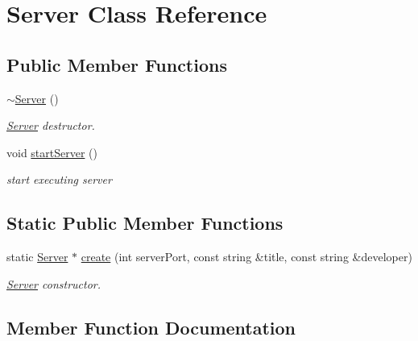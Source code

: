 \hypertarget{class_server}{}\section{Server Class Reference}
\label{class_server}
\subsection*{Public Member Functions}
\begin{DoxyCompactItemize}
\item 
\mbox{\label{class_server_a4b3aa2579cb1c8cd1d069582c14d0fa6}} 
\hyperlink{class_server_a4b3aa2579cb1c8cd1d069582c14d0fa6}{$\sim$\+Server} ()
\begin{DoxyCompactList}\small\item\em \hyperlink{class_server}{Server} destructor. \end{DoxyCompactList}\item 
\mbox{\label{class_server_af59bb3a96b3311ed2b87e2d6899d9f79}} 
void \hyperlink{class_server_af59bb3a96b3311ed2b87e2d6899d9f79}{start\+Server} ()
\begin{DoxyCompactList}\small\item\em start executing server \end{DoxyCompactList}\end{DoxyCompactItemize}
\subsection*{Static Public Member Functions}
\begin{DoxyCompactItemize}
\item 
static \hyperlink{class_server}{Server} $\ast$ \hyperlink{class_server_aa7642b17daf4e8bb1044b5a5a15c6eb8}{create} (int server\+Port, const string \&title, const string \&developer)
\begin{DoxyCompactList}\small\item\em \hyperlink{class_server}{Server} constructor. \end{DoxyCompactList}\end{DoxyCompactItemize}


\subsection{Member Function Documentation}
\mbox{\label{class_server_aa7642b17daf4e8bb1044b5a5a15c6eb8}} 
